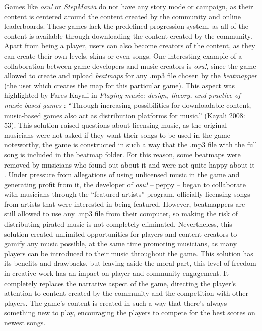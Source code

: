 Games like \textit{osu!} or \textit{StepMania} do not have any story mode or campaign, as their content is centered around the content created by the community and online leaderboards. These games lack the predefined progression system, as all of the content is available through downloading the content created by the community. Apart from being a player, users can also become creators of the content, as they can create their own levels, skins or even songs. One interesting example of a collaboration between game developers and music creators is \textit{osu!}, since the game allowed to create and upload \textit{beatmaps} for any .mp3 file chosen by the \textit{beatmapper} (the user which creates the map for this particular game). This aspect was highlighted by Fares Kayali in \textit{Playing music: design, theory, and practice of music-based games} \cite{faresplayingmusic}: ``Through increasing possibilities for downloadable content, music-based games also act as distribution platforms for music.'' (Kayali 2008: 53). This solution raised questions about licensing music, as the original musicians were not asked if they want their songs to be used in the game - noteworthy, the game is constructed in such a way that the .mp3 file with the full song is included in the beatmap folder. For this reason, some beatmaps were removed by musicians who found out about it and were not quite happy about it \cite{osucontroversy}. Under pressure from allegations of using unlicensed music in the game and generating profit from it, the developer of \textit{osu!} -- peppy -- began to collaborate with musicians through the ``featured artists'' program, officially licensing songs from artists that were interested in being featured. 
However, beatmappers are still allowed to use any .mp3 file from their computer, so making the risk of distributing pirated music is not completely eliminated. Nevertheless, this solution created unlimited opportunities for players and content creators to gamify any music possible, at the same time promoting musicians, as many players can be introduced to their music throughout the game. This solution has its benefits and drawbacks, but leaving aside the moral part, this level of freedom in creative work has an impact on player and community engagement. It completely replaces the narrative aspect of the game, directing the player’s attention to content created by the community and the competition with other players. The game’s content is created in such a way that there’s always something new to play, encouraging the players to compete for the best scores on newest songs.

